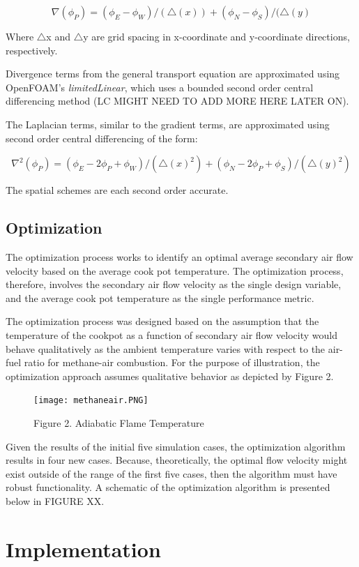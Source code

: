 \documentclass[3p,times,twocolumn]{elsarticle}
\begin{document}
\[\nabla(\phi_{P}) = (\phi_{E} - \phi_{W})/(\triangle(x)) + (\phi_{N} - \phi_{S})/(\triangle(y)\]


Where $\triangle$x and $\triangle$y are grid spacing in x-coordinate and y-coordinate directions, respectively.

Divergence terms from the general transport equation are approximated using OpenFOAM's \textit{limitedLinear}, which uses a bounded second order central differencing method (LC MIGHT NEED TO ADD MORE HERE LATER ON). 

The Laplacian terms, similar to the gradient terms, are approximated using second order central differencing of the form:

\[\nabla^{2}(\phi_{P}) = (\phi_{E}-2\phi_{P} +\phi_{W})/(\triangle(x)^{2}) + (\phi_{N}-2\phi_{P} + \phi_{S})/(\triangle(y)^{2})\]

The spatial schemes are each second order accurate.

\subsection{Optimization}
The optimization process works to identify an optimal average secondary air flow velocity based on the average cook pot temperature. The optimization process, therefore, involves the secondary air flow velocity as the single design variable, and the average cook pot temperature as the single performance metric.  

The optimization process was designed based on the assumption that the temperature of the cookpot as a function of secondary air flow velocity would behave qualitatively as the ambient temperature varies with respect to the air-fuel ratio for methane-air combustion. For the purpose of illustration, the optimization approach assumes qualitative behavior as depicted by Figure 2.
\begin{figure}{\linewidth}
	\texttt{[image: methaneair.PNG]}
	\caption{Figure 2. Adiabatic Flame Temperature}
\end{figure}


Given the results of the initial five simulation cases, the optimization algorithm results in four new cases. Because, theoretically, the optimal flow velocity might exist outside of the range of the first five cases, then the algorithm must have robust functionality. A schematic of the optimization algorithm is presented below in FIGURE XX.



\section{Implementation}
\end{document}
